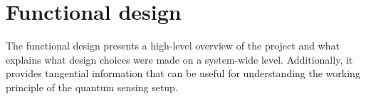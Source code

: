 \chapter{Functional design} \label{chap:func_design}
The functional design presents a high-level overview of the project and what explains what design choices were made on a system-wide level. Additionally, it provides tangential information that can be useful for understanding the working principle of the quantum sensing setup.

%
%
%

